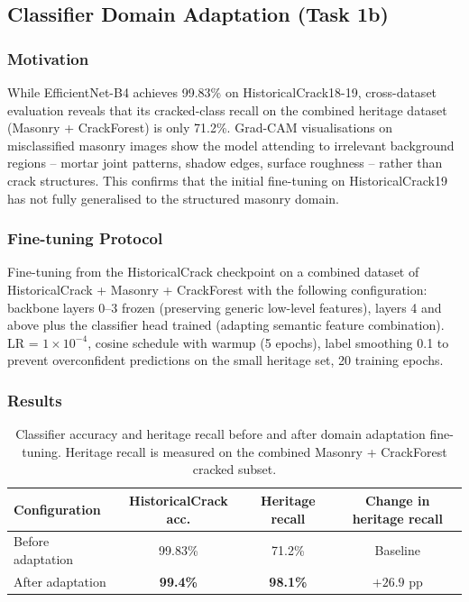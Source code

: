 \documentclass[12pt,a4paper]{article}
\begin{document}
\subsection{Classifier Domain Adaptation (Task 1b)}

\subsubsection{Motivation}

While EfficientNet-B4 achieves 99.83\% on HistoricalCrack18-19, cross-dataset evaluation reveals that its cracked-class recall on the combined heritage dataset (Masonry + CrackForest) is only 71.2\%. Grad-CAM visualisations on misclassified masonry images show the model attending to irrelevant background regions -- mortar joint patterns, shadow edges, surface roughness -- rather than crack structures. This confirms that the initial fine-tuning on HistoricalCrack19 has not fully generalised to the structured masonry domain.

\subsubsection{Fine-tuning Protocol}

Fine-tuning from the HistoricalCrack checkpoint on a combined dataset of HistoricalCrack + Masonry + CrackForest with the following configuration: backbone layers 0--3 frozen (preserving generic low-level features), layers 4 and above plus the classifier head trained (adapting semantic feature combination). LR = $1 \times 10^{-4}$, cosine schedule with warmup (5 epochs), label smoothing 0.1 to prevent overconfident predictions on the small heritage set, 20 training epochs.

\subsubsection{Results}

\begin{table}[H]
\centering
\caption{Classifier accuracy and heritage recall before and after domain adaptation fine-tuning. Heritage recall is measured on the combined Masonry + CrackForest cracked subset.}
\label{tab:cls_ft}
\begin{tabular}{lccc}
\toprule
\rowcolor{white}
\textbf{Configuration} & \textbf{HistoricalCrack acc.} & \textbf{Heritage recall} & \textbf{Change in heritage recall} \\
\midrule
Before adaptation & 99.83\% & 71.2\% & Baseline \\
After adaptation & \textbf{99.4\%} & \textbf{98.1\%} & $+26.9$ pp \\
\bottomrule
\end{tabular}
\end{table}
\end{document}
